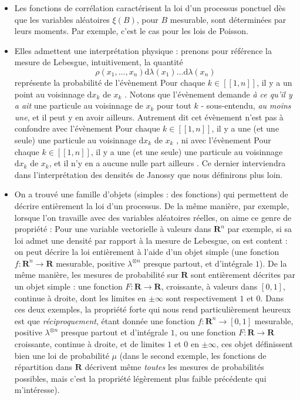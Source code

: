 \documentclass[12pt]{article}
\begin{document}
\begin{itemize}
  
  \item Les fonctions de corrélation caractérisent la loi d'un processus ponctuel dès que les variables aléatoires $ \xi(B) $, pour $B$ mesurable, sont déterminées par leurs moments. Par exemple, c'est le cas pour les lois de Poisson.

  \item Elles admettent une interprétation physique : prenons pour référence la mesure de Lebesgue, intuitivement, la quantité $$ \rho(x_1,...,x_n) \mathrm d \lambda (x_1) ... \mathrm d \lambda (x_n) $$ représente la probabilité de l'évènement \og Pour chaque $ k \in [\![1,n]\!] $, il y a un point au voisinnage $\mathrm d x_k$ de $ x_k $ \fg. Notons que l'évènement demande \textit{à ce qu'il y a ait} une particule au voisinnage de $x_k$ pour tout $k$ - sous-entendu, \textit{au moins une}, et il peut y en avoir ailleurs. Autrement dit cet évènement n'est pas à confondre avec l'évènement \og Pour chaque $ k \in [\![1,n]\!] $, il y a une (et une seule) une particule au voisinnage $\mathrm d x_k$ de $ x_k $ \fg, ni avec l'évènement \og Pour chaque $ k \in [\![1,n]\!] $, il y a une (et une seule) une particule au voisinnage $\mathrm d x_k$ de $ x_k $, et il n'y en a aucune nulle part ailleurs \fg. Ce dernier interviendra dans l'interprétation des densités de Janossy que nous définirons plus loin.

  \item On a trouvé une famille d'objets (simples : des fonctions) qui permettent de décrire entièrement la loi d'un processus. De la même manière, par exemple, lorsque l'on travaille avec des variables aléatoires réelles, on aime ce genre de propriété : Pour une variable vectorielle à valeurs dans $ \mathbf R^n $ par exemple, si sa loi admet une densité par rapport à la mesure de Lebesgue, on est content : on peut décrire la loi entièrement à l'aide d'un objet simple (une fonction $f : \mathbf R^n \to \mathbf R $ mesurable, positive $\lambda^{\otimes n}$ presque partout, et d'intégrale $1$). De la même manière, les mesures de probabilité sur $ \mathbf R $ sont entièrement décrites par un objet simple : une fonction $ F : \mathbf R \to \mathbf R $, croissante, à valeurs dans $ [0,1] $, continue à droite, dont les limites en $ \pm \infty $ sont respectivement $ 1 $ et $ 0 $. Dans ces deux exemples, la propriété forte qui nous rend particulièrement heureux est que \textit{réciproquement}, étant donnée une fonction $ f : \mathbf R^n \to [0,1] $ mesurable, positive $\lambda^{\otimes n}$ presque partout et d'intégrale $1$, ou une fonction $F : \mathbf R \to \mathbf R $ croissante, continue à droite, et de limites $ 1 $ et $ 0 $ en $ \pm \infty$, ces objet définissent bien une loi de probabilité $ \mu $ (dans le second exemple, les fonctions de répartition dans $ \mathbf R$ décrivent même \textit{toutes} les mesures de probabilités possibles, mais c'est la propriété légèrement plus faible précédente qui m'intéresse). 


\end{itemize}
\end{document}
